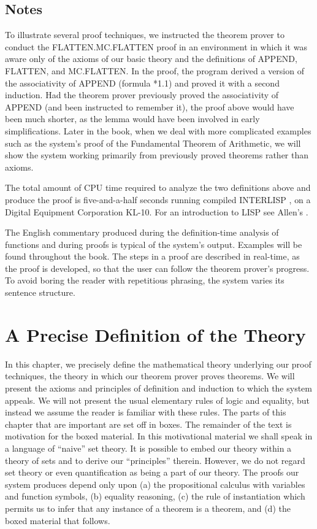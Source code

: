 \documentclass[11pt]{book}
\newcommand{\pubdefaulttextsize}{\large}
\begin{document}
\section{Notes}
\pubdefaulttextsize
To illustrate several proof techniques, we instructed the
theorem prover to conduct the FLAT\-TEN.MC.FLAT\-TEN proof
in an environment in which it was aware only of the
axioms of our basic theory and the definitions of APPEND,
FLAT\-TEN, and MC.FLAT\-TEN.
In the proof, the program derived a version of
the associativity of APPEND (formula *1.1) and proved it with a
second induction.  Had the theorem prover
previously proved the associativity of APPEND (and been instructed to
remember it), the proof above would have been much shorter, as the
lemma would have been involved in early simplifications.  Later in the book,
when we deal with more complicated examples such as the system's
proof of the Fundamental Theorem of Arithmetic, we will show the
system working primarily from previously proved theorems rather than
axioms.

The total amount of
CPU time required to analyze the two definitions above and produce
the proof is five-and-a-half seconds running compiled INTERLISP
\cite{TEITELMAN}, \cite{VM} on a Digital Equipment Corporation KL-10.  For an
introduction to LISP see Allen's \cite{JOHNALLEN}.

The English commentary produced during the definition-time analysis of
functions and during proofs is typical of the system's
output.  Examples will be found throughout the book.
The steps in a proof are described in real-time,
as the proof is developed, so that the user can follow the theorem prover's
progress.  To avoid boring the reader with repetitious phrasing, the system
varies its sentence structure.
\chapter{A Precise Definition of the Theory}
\label{SECTHEFORMALTHEORY}
\pubdefaulttextsize
In this chapter, we precisely
define the mathematical theory underlying our proof
techniques, the theory in which our theorem prover
proves theorems.  We will present the axioms and 
principles of definition and induction to which
the system appeals.  We will not present
the usual elementary rules of logic and equality,
but instead we assume the reader is familiar with
these rules.  The parts of this chapter that are
important are set off in boxes.
The remainder of the text is motivation
for the boxed material.  In this motivational
material we shall speak in a language of ``naive''
set theory.  It is  possible to embed
our theory within a theory of sets and to
derive our ``principles'' therein.  However, we  do not regard
set theory or even quantification as being a part
of our theory.  The proofs our system produces depend only upon (a)
the propositional calculus with variables and function symbols,
(b) equality reasoning, (c) the rule of instantiation which
permits us to infer that any instance of a theorem is a theorem,
and (d) the boxed material that follows.
\end{document}
